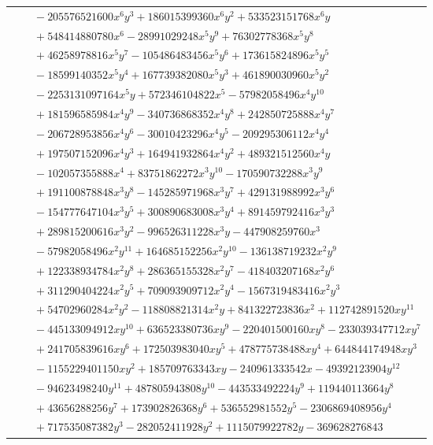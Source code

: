 \documentclass[11pt]{article}
\begin{document}
\begin{longtable}{@{}ll@{}}
 & $\quad -205576521600x^{6}y^{3}+186015399360x^{6}y^{2}+533523151768x^{6}y$\\
 & $\quad +548414880780x^{6}-28991029248x^{5}y^{9}+76302778368x^{5}y^{8}$\\
 & $\quad +46258978816x^{5}y^{7}-105486483456x^{5}y^{6}+173615824896x^{5}y^{5}$\\
 & $\quad -18599140352x^{5}y^{4}+167739382080x^{5}y^{3}+461890030960x^{5}y^{2}$\\
 & $\quad -2253131097164x^{5}y+572346104822x^{5}-57982058496x^{4}y^{10}$\\
 & $\quad +181596585984x^{4}y^{9}-340736868352x^{4}y^{8}+242850725888x^{4}y^{7}$\\
 & $\quad -206728953856x^{4}y^{6}-30010423296x^{4}y^{5}-209295306112x^{4}y^{4}$\\
 & $\quad +197507152096x^{4}y^{3}+164941932864x^{4}y^{2}+489321512560x^{4}y$\\
 & $\quad -102057355888x^{4}+83751862272x^{3}y^{10}-170590732288x^{3}y^{9}$\\
 & $\quad +191100878848x^{3}y^{8}-145285971968x^{3}y^{7}+429131988992x^{3}y^{6}$\\
 & $\quad -154777647104x^{3}y^{5}+300890683008x^{3}y^{4}+891459792416x^{3}y^{3}$\\
 & $\quad +289815200616x^{3}y^{2}-996526311228x^{3}y-447908259760x^{3}$\\
 & $\quad -57982058496x^{2}y^{11}+164685152256x^{2}y^{10}-136138719232x^{2}y^{9}$\\
 & $\quad +122338934784x^{2}y^{8}+286365155328x^{2}y^{7}-418403207168x^{2}y^{6}$\\
 & $\quad +311290404224x^{2}y^{5}+709093909712x^{2}y^{4}-1567319483416x^{2}y^{3}$\\
 & $\quad +54702960284x^{2}y^{2}-118808821314x^{2}y+841322723836x^{2}+112742891520xy^{11}$\\
 & $\quad -445133094912xy^{10}+636523380736xy^{9}-220401500160xy^{8}-233039347712xy^{7}$\\
 & $\quad +241705839616xy^{6}+172503983040xy^{5}+478775738488xy^{4}+644844174948xy^{3}$\\
 & $\quad -1155229401150xy^{2}+185709763343xy-240961333542x-49392123904y^{12}$\\
 & $\quad -94623498240y^{11}+487805943808y^{10}-443533492224y^{9}+119440113664y^{8}$\\
 & $\quad +43656288256y^{7}+173902826368y^{6}+536552981552y^{5}-2306869408956y^{4}$\\
 & $\quad +717535087382y^{3}-282052411928y^{2}+1115079922782y-369628276843$\\

\end{longtable}
\end{document}
